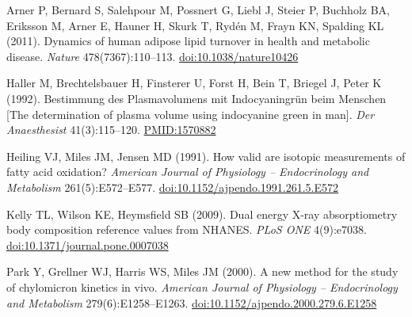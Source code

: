 \item Arner P, Bernard S, Salehpour M, Possnert G, Liebl J, Steier P, Buchholz BA, Eriksson M, Arner E, Hauner H, Skurk T, Rydén M, Frayn KN, Spalding KL (2011). Dynamics of human adipose lipid turnover in health and metabolic disease. \emph{Nature} 478(7367):110–113. \href{https://doi.org/10.1038/nature10426}{doi:10.1038/nature10426}
\item Haller M, Brechtelsbauer H, Finsterer U, Forst H, Bein T, Briegel J, Peter K (1992). Bestimmung des Plasmavolumens mit Indocyaningrün beim Menschen [The determination of plasma volume using indocyanine green in man]. \emph{Der Anaesthesist} 41(3):115–120. \href{https://pubmed.ncbi.nlm.nih.gov/1570882/}{PMID:1570882}
\item Heiling VJ, Miles JM, Jensen MD (1991). How valid are isotopic measurements of fatty acid oxidation? \emph{American Journal of Physiology – Endocrinology and Metabolism} 261(5):E572–E577. \href{https://doi.org/10.1152/ajpendo.1991.261.5.E572}{doi:10.1152/ajpendo.1991.261.5.E572}
\item Kelly TL, Wilson KE, Heymsfield SB (2009). Dual energy X-ray absorptiometry body composition reference values from NHANES. \emph{PLoS ONE} 4(9):e7038. \href{https://doi.org/10.1371/journal.pone.0007038}{doi:10.1371/journal.pone.0007038}
\item Park Y, Grellner WJ, Harris WS, Miles JM (2000). A new method for the study of chylomicron kinetics in vivo. \emph{American Journal of Physiology – Endocrinology and Metabolism} 279(6):E1258–E1263. \href{https://doi.org/10.1152/ajpendo.2000.279.6.E1258}{doi:10.1152/ajpendo.2000.279.6.E1258}
